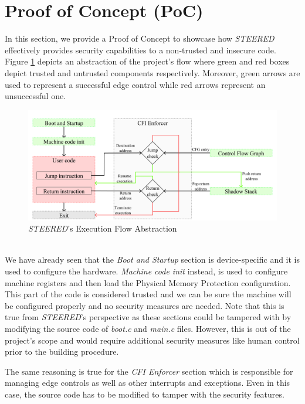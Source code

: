 \section{Proof of Concept (PoC)}
\label{sec:project_poc}

In this section, we provide a Proof of Concept to showcase how \textit{STEERED} effectively
provides security capabilities to a non-trusted and insecure code. Figure
\ref{fig:functioning} depicts an abstraction of the project's flow where green
and red boxes depict trusted and untrusted components respectively. Moreover,
green arrows are used to represent a successful edge control while red arrows
represent an unsuccessful one. \\
\begin{figure}[htbp]
  \centering
  \includegraphics[width=.9\linewidth]{images/functioning.png}
  \caption{\textit{STEERED}'s Execution Flow Abstraction}
  \label{fig:functioning}
\end{figure}
\\

We have already seen that the \textit{Boot and Startup} section is device-specific
and it is used to configure the hardware. \textit{Machine code init} instead, is
used to configure machine registers and then load the Physical Memory Protection
configuration. This part of the code is considered trusted and we can be sure the
machine will be configured properly and no security measures are needed. Note
that this is true from \textit{STEERED}'s perspective as these sections could be
tampered with by modifying the source code of \textit{boot.c} and \textit{main.c}
files. However, this is out of the project's scope and would require additional security
measures like human control prior to the building procedure.

The same reasoning is true for the \textit{CFI Enforcer} section which is
responsible for managing edge controls as well as other interrupts and
exceptions. Even in this case, the source code has to be modified to tamper with
the security features.

